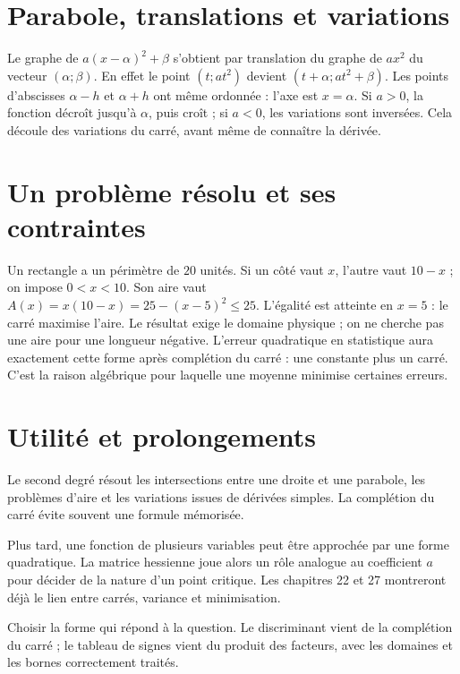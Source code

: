 \documentclass[../cours_1re.tex]{subfiles}
\begin{document}
\section{Parabole, translations et variations}
Le graphe de $a(x-\alpha)^2+\beta$ s'obtient par translation du graphe de $ax^2$ du vecteur $(\alpha;\beta)$. En effet le point $(t;at^2)$ devient $(t+\alpha;at^2+\beta)$.
Les points d'abscisses $\alpha-h$ et $\alpha+h$ ont même ordonnée : l'axe est $x=\alpha$.
Si $a>0$, la fonction décroît jusqu'à $\alpha$, puis croît ; si $a<0$, les variations sont inversées. Cela découle des variations du carré, avant même de connaître la dérivée.
\begin{center}
\end{center}
\begin{finchapitre}
\section{Un problème résolu et ses contraintes}
Un rectangle a un périmètre de $20$ unités. Si un côté vaut $x$, l'autre vaut $10-x$ ; on impose $0<x<10$. Son aire vaut
$A(x)=x(10-x)=25-(x-5)^2\le25$. L'égalité est atteinte en $x=5$ : le carré maximise l'aire.
Le résultat exige le domaine physique ; on ne cherche pas une aire pour une longueur négative.
\approfondissement L'erreur quadratique en statistique aura exactement cette forme après complétion du carré : une constante plus un carré. C'est la raison algébrique pour laquelle une moyenne minimise certaines erreurs.


\section{Utilité et prolongements}
Le second degré résout les intersections entre une droite et une parabole, les problèmes d'aire et les variations issues de dérivées simples. La complétion du carré évite souvent une formule mémorisée.

Plus tard, une fonction de plusieurs variables peut être approchée par une forme quadratique. La matrice hessienne joue alors un rôle analogue au coefficient $a$ pour décider de la nature d'un point critique. Les chapitres 22 et 27 montreront déjà le lien entre carrés, variance et minimisation.
\begin{retenir}
Choisir la forme qui répond à la question. Le discriminant vient de la complétion du carré ; le tableau de signes vient du produit des facteurs, avec les domaines et les bornes correctement traités.
\end{retenir}
\end{finchapitre}
\end{document}
